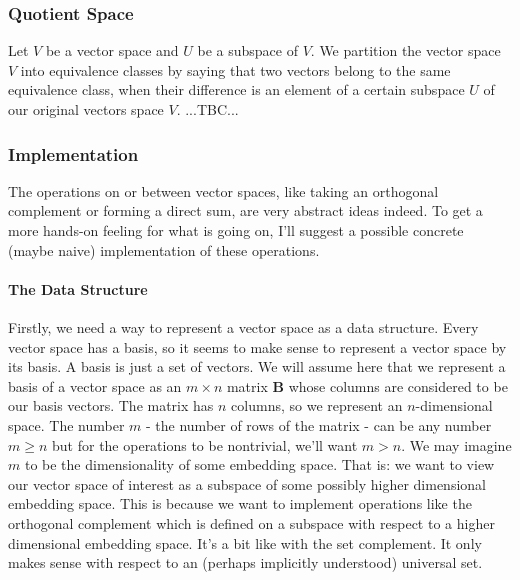 



\subsubsection{Quotient Space}
Let $V$ be a vector space and $U$ be a subspace of $V$. We partition the vector space $V$ into equivalence classes by saying that two vectors belong to the same equivalence class, when their difference is an element of a certain subspace $U$ of our original vectors space $V$. ...TBC...




\subsubsection{Implementation}
The operations on or between vector spaces, like taking an orthogonal complement or forming a direct sum, are very abstract ideas indeed. To get a more hands-on feeling for what is going on, I'll suggest a possible concrete (maybe naive) implementation of these operations. 

\paragraph{The Data Structure}
Firstly, we need a way to represent a vector space as a data structure. Every vector space has a basis, so it seems to make sense to represent a vector space by its basis. A basis is just a set of vectors. We will assume here that we represent a basis of a vector space as an $m \times n$ matrix $\mathbf{B}$ whose columns are considered to be our basis vectors. The matrix has $n$ columns, so we represent an $n$-dimensional space. The number $m$ - the number of rows of the matrix - can be any number $m \geq n$ but for the operations to be nontrivial, we'll want $m > n$. We may imagine $m$ to be the dimensionality of some embedding space. That is: we want to view our vector space of interest as a subspace of some possibly higher dimensional embedding space. This is because we want to implement operations like the orthogonal complement which is defined on a subspace with respect to a higher dimensional embedding space. It's a bit like with the set complement. It only makes sense with respect to an (perhaps implicitly understood) universal set.


